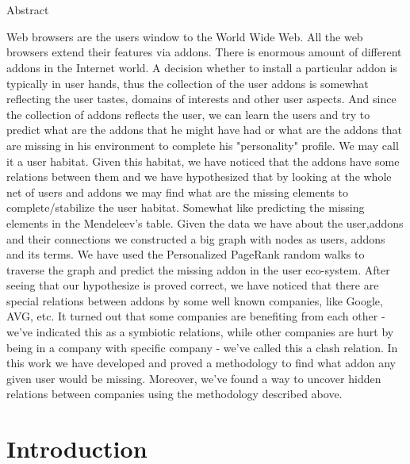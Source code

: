 \documentclass[11pt,oneside]{book}
\begin{document}
\chapter*{}

\begin{center}
\huge{Abstract}
\end{center}


Web browsers are the users window to the World Wide Web. All the web browsers extend their features via addons. There is enormous amount of different addons in the Internet world. A decision whether to install a particular addon is typically in user hands, thus the collection of the user addons is somewhat reflecting the user tastes, domains of interests and other user aspects. And since the collection of addons reflects the user, we can learn the users and try to predict what are the addons that he might have had or what are the addons that are missing in his environment to complete his "personality" profile.
We may call it a user habitat. Given this habitat, we have noticed that the addons have some relations between them and we have hypothesized that by looking at the whole net of users and addons we may find what are the missing elements to complete/stabilize the user habitat. Somewhat like predicting the missing elements in the Mendeleev's table.
Given the data we have about the user,addons and their connections we constructed a big graph with nodes as users, addons and its terms. We have used the Personalized PageRank random walks to traverse the graph and predict the missing addon in the user eco-system. After seeing that our hypothesize is proved correct, we have noticed that there are special relations between addons by some well known companies, like Google, AVG, etc. It turned out that some companies are benefiting from each other - we've indicated this as a symbiotic relations, while other companies are hurt by being in a company with specific company - we've called this a clash relation.
In this work we have developed and proved a methodology to find what addon any given user would be missing. Moreover, we've found a way to uncover hidden relations between companies using the methodology described above.
 

\tableofcontents

\listoffigures
{}
\listoftables
{}

\chapter{Introduction}
\thispagestyle{empty}
\end{document}
